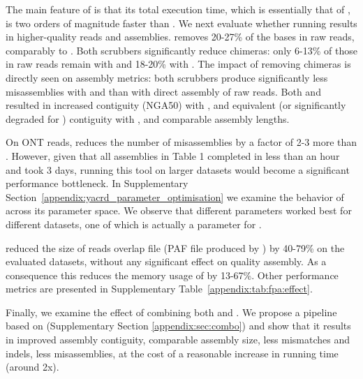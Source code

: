 \documentclass[./main.tex]{subfiles}
\begin{document}
The main feature of \yacrd is that its total execution time, which is essentially that of \minimap, is two orders of magnitude faster than \dascrubber. We next evaluate whether running \yacrd results in higher-quality reads and assemblies. \yacrd removes 20-27\% of the bases in raw reads, comparably to \dascrubber. Both scrubbers significantly reduce chimeras: only  6-13\% of those in raw reads remain with \dascrubber and 18-20\% with \yacrd. The impact of removing chimeras is directly seen on assembly metrics: both scrubbers produce significantly less misassemblies with \miniasm and \wtdbg than with direct assembly of raw reads.
Both \yacrd and \dascrubber resulted in increased contiguity (NGA50) with \miniasm, and equivalent (or significantly degraded for \dascrubber) contiguity with \wtdbg, and comparable assembly lengths.

On ONT reads, \dascrubber reduces the number of misassemblies by a factor of 2-3 more than \yacrd. However, given that all assemblies in Table 1 completed in less than an hour and \dascrubber took 3 days, running this tool on larger datasets would become a significant performance bottleneck.
In Supplementary Section~\ref{appendix:yacrd_parameter_optimisation} we examine the behavior of \yacrd across its parameter space. We observe that different parameters worked best for different datasets, one of which is actually a parameter for \minimap. 

\textbf{\fpa} reduced the size of reads overlap file (PAF file produced by \minimap) by 40-79\% on the evaluated datasets, without any significant effect on quality assembly. As a consequence this reduces the memory usage of \miniasm by 13-67\%. Other performance metrics are presented in Supplementary Table~\ref{appendix:tab:fpa:effect}.


Finally, we examine the effect of combining both \yacrd and \fpa. We propose a pipeline based on \miniasm (Supplementary Section \ref{appendix:sec:combo}) and show that it results in improved assembly contiguity, comparable assembly size, less mismatches and indels, less misassemblies, at the cost of a reasonable increase in running time (around 2x).



\end{document}

